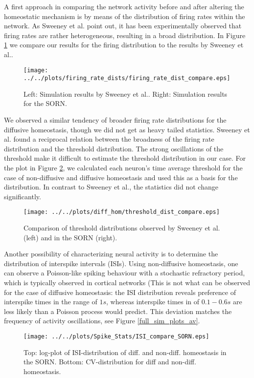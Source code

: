 \documentclass[10pt,a4paper]{article}
\begin{document}
A first approach in comparing the network activity before and after altering the homeostatic mechanism is by means of the distribution of firing rates within the network. As Sweeney et al. point out, it has been experimentally observed that firing rates are rather heterogeneous, resulting in a broad distribution. In Figure \ref{firing_rate_dist_comp} we compare our results for the firing distribution to the results by Sweeney et al.. 
\begin{figure}
\texttt{[image: ../../plots/firing\_rate\_dists/firing\_rate\_dist\_compare.eps]}
\caption{Left: Simulation results by Sweeney et al.. Right: Simulation results for the SORN.}
\label{firing_rate_dist_comp}
\end{figure}
We observed a similar tendency of broader firing rate distributions for the diffusive homeostasis, though we did not get as heavy tailed statistics. Sweeney et al. found a reciprocal relation between the broadness of the firing rate distribution and the threshold distribution. The strong oscillations of the threshold make it difficult to estimate the threshold distribution in our case. For the plot in Figure \ref{thresh_dist_comp}, we calculated each neuron's time average threshold for the case of non-diffusive and diffusive homeostasis and used this as a basis for the distribution. In contrast to Sweeney et al., the statistics did not change significantly.
\begin{figure}
\texttt{[image: ../../plots/diff\_hom/threshold\_dist\_compare.eps]}
\caption{Comparison of threshold distributions observed by Sweeney et al. (left) and in the SORN (right).}
\label{thresh_dist_comp}
\end{figure}



Another possibility of characterizing neural activity is to determine the distribution of interspike intervals (ISIs). Using non-diffusive homeostasis, one can observe a Poisson-like spiking behaviour with a stochastic refractory period, which is typically observed in cortical networks (This is not what can be observed for the case of diffusive homeostasis: the ISI distribution reveals preference of interspike times in the range of $1s$, whereas interspike times in of $0.1-0.6s$ are less likely than a Poisson process would predict. This deviation matches the frequency of activity oscillations, see Figure \ref{full_sim_plots_av}.
\begin{figure}
\texttt{[image: ../../plots/Spike\_Stats/ISI\_compare\_SORN.eps]}
\caption{Top: log-plot of ISI-distribution of diff. and non-diff. homeostasis in the SORN. Bottom: CV-distribution for diff and non-diff. homeostasis.}
\label{ISI_compare}
\end{figure}
\end{document}
